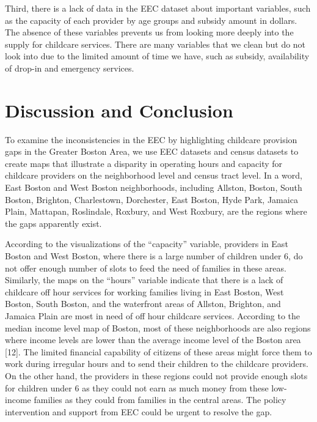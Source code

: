 \documentclass[10pt,letterpaper]{article}
\begin{document}
Third, there is a lack of data in the EEC dataset about important
variables, such as the capacity of each provider by age groups and
subsidy amount in dollars. The absence of these variables prevents us
from looking more deeply into the supply for childcare services. There
are many variables that we clean but do not look into due to the limited
amount of time we have, such as subsidy, availability of drop-in and
emergency services.

\section{Discussion and Conclusion}\label{discussion-and-conclusion}

To examine the inconsistencies in the EEC by highlighting childcare
provision gaps in the Greater Boston Area, we use EEC datasets and
census datasets to create maps that illustrate a disparity in operating
hours and capacity for childcare providers on the neighborhood level and
census tract level. In a word, East Boston and West Boston
neighborhoods, including Allston, Boston, South Boston, Brighton,
Charlestown, Dorchester, East Boston, Hyde Park, Jamaica Plain,
Mattapan, Roslindale, Roxbury, and West Roxbury, are the regions where
the gaps apparently exist.

According to the visualizations of the ``capacity'' variable, providers
in East Boston and West Boston, where there is a large number of
children under 6, do not offer enough number of slots to feed the need
of families in these areas. Similarly, the maps on the ``hours''
variable indicate that there is a lack of childcare off hour services
for working families living in East Boston, West Boston, South Boston,
and the waterfront areas of Allston, Brighton, and Jamaica Plain are
most in need of off hour childcare services. According to the median
income level map of Boston, most of these neighborhoods are also regions
where income levels are lower than the average income level of the
Boston area {[}12{]}. The limited financial capability of citizens of
these areas might force them to work during irregular hours and to send
their children to the childcare providers. On the other hand, the
providers in these regions could not provide enough slots for children
under 6 as they could not earn as much money from these low-income
families as they could from families in the central areas. The policy
intervention and support from EEC could be urgent to resolve the gap.
\end{document}
